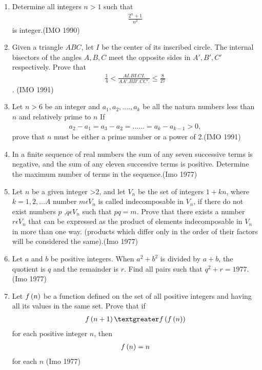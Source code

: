 \begin{enumerate}
	\item Determine all integers $n>1$  such that
		\begin{align*} \frac{{2^n}+1}{n^2}\end{align*}is integer.\hfill(IMO 1990)


 \item Given a triangle $ABC$, let $I$ be the center of its inscribed circle. The internal bisectors of the angles $A, B, C$ meet the opposite sides in $A', B', C'$ respectively. Prove that
	 \begin{align*}\frac{1}{4} < \frac{AI. BI. CI.}{AA'. BB'. CC'.}\leq\frac{8}{27}\end{align*}. \hfill(IMO 1991)


\item Let $n > 6$ be an integer and $a_1, a_2,....,a_k $ be all the natura numbers less than $n$ and relatively prime to $n$ If \begin{align*}
a_2-a_1=a_3-a_2=......=a_k-a_{k-1} > 0,\end{align*}
       prove that $n$ must be either a prime number or a power of 2.\hfill(IMO 1991)
       \item In a finite sequence of real numbers the sum of any seven successive terms is negative, and the sum of any eleven successive terms is positive. Determine the maximum number of terms in the sequence.\hfill(Imo 1977)

\item 	Let $n$ be a given integer \textgreater $2$, and let $V_{n}$ be the set of integers $1+ kn$, where $k = 1, 2 ,\ldots A$ number $m \epsilon V_{n}$ is called indecomposable in $V_{n}$, if there do not exist numbers $p$ ,$q \epsilon V_{n}$ such that $pq = m$. Prove that there exists a number $r \epsilon V_{n}$ that can be expressed as the product of elements indecomposable in $V_{n}$ in more than one way. (products which differ only in the order of their factors will be considered the same).\hfill(Imo 1977)

\item Let $a$ and $b$ be positive integers. When $a^2 + b^2$ is divided by $a+b$, the quotient is $q$ and the remainder is $r$. Find all pairs  such that $q^2 + r = 1977.$ \hfill(Imo 1977)

\item	Let $f\left(n\right)$ be a function defined on the set of all positive integers and having all its values in the same set. Prove that if \begin{align}f\brak{n + 1} \textgreater f\brak{f\brak{n}}\end{align} for each positive integer $n$, then \begin{align}f\left(n\right) = n\end{align} for each $n$
		\hfill(Imo 1977)


\end{enumerate}
